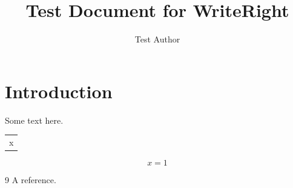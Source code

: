 \documentclass{article}
\title{Test Document for WriteRight}
\author{Test Author}
\begin{document}

\section{Introduction}
\label{method-no-prefix}

Some text here.

\begin{figure}[t]
  \centering
  \label{wrongfig}
\end{figure}

\begin{table}[t]
  \centering
  \label{wrongtab}
  \begin{tabular}{l}
    x \\
  \end{tabular}
\end{table}

\begin{equation}
  x = 1
  \label{bad-eq}
\end{equation}

\begin{thebibliography}{9}
 A reference.
\end{thebibliography}
\end{document}
